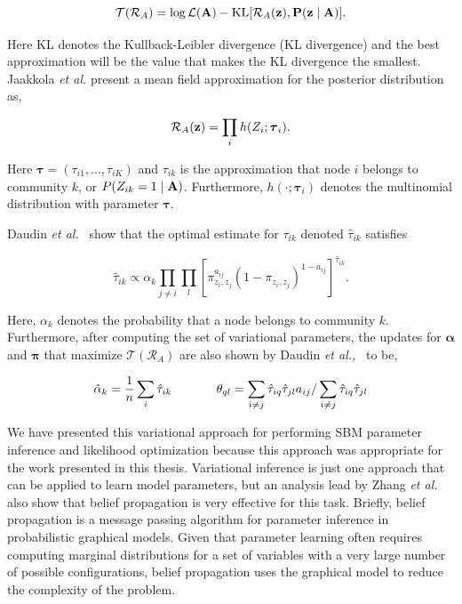 \begin{equation}
\mathcal{T}(\mathcal{R}_{A})=\log \mathcal{L}({\bf A})-\text{KL}[\mathcal{R}_{A}(\bf z), P({\bf z} \mid {\bf A})].
\end{equation}

Here KL denotes the Kullback-Leibler divergence (KL divergence) and the best approximation will be the value that makes the KL divergence the smallest. Jaakkola \emph{et al.} present a mean field approximation for the posterior distribution \cite{jakk} as,

\begin{equation}
\mathcal{R}_{A}({\bf z})=\prod_{i}h(Z_{i};{\boldsymbol \tau}_{i}).
\end{equation}

Here ${\boldsymbol \tau}=(\tau_{i1}, \dots, \tau_{iK})$ and $\tau_{ik}$ is the approximation that node $i$ belongs to community $k$, or $P(Z_{ik}=1 \mid {\bf A})$. Furthermore, $h(\cdot;{\boldsymbol \tau}_{i})$ denotes the multinomial distribution with parameter ${\boldsymbol \tau}$. 

Daudin \emph{et al.}~\cite{dudin} show that the optimal estimate for $\tau_{ik}$ denoted $\hat{\tau}_{ik}$ satisfies

\begin{equation}
\hat{\tau}_{ik} \propto \alpha_{k}\prod_{j \ne i}\prod_{l}[\pi_{z_{i},z_{j}}^{a_{ij}}(1-\pi_{z_{i},z_{j}})^{1-a_{ij}}]^{\hat{\tau}_{ik}}.
\end{equation}

Here, $\alpha_{k}$ denotes the probability that a node belongs to community $k$. Furthermore, after computing the set of variational parameters, the updates for ${\boldsymbol \alpha}$ and ${\boldsymbol \pi}$ that maximize $\mathcal{T}(\mathcal{R}_{A})$ are also shown by Daudin \emph{et al.,}~\cite{dudin} to be,

\begin{equation}
\hat{\alpha}_{k}=\frac{1}{n}\sum_{i}\hat{\tau}_{ik}  \hspace{.5in}  {\theta}_{ql}=\sum_{i \ne j}\hat{\tau}_{iq}\hat{\tau}_{jl}a_{ij}/\sum_{i \ne j}\hat{\tau}_{iq}\hat{\tau}_{jl}
\end{equation}

We have presented this variational approach for performing SBM parameter inference and likelihood optimization because this approach was appropriate for the work presented in this thesis. Variational inference is just one approach that can be applied to learn model parameters, but an analysis lead by  Zhang \emph{et al.} \cite{comp} also show that belief propagation \cite{belief} is very effective for this task. Briefly, belief propagation is a message passing algorithm for parameter inference in probabilistic graphical models. Given that parameter learning often requires computing marginal distributions for a set of variables with a very large number of possible configurations, belief propagation uses the graphical model to reduce the complexity of the problem.  


